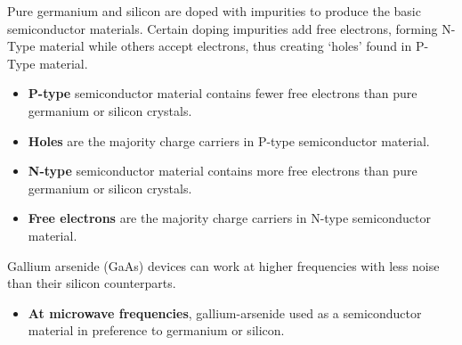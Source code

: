 \documentclass[letterpaper]{article}
\begin{document}
        Pure germanium and silicon are doped with impurities to produce the basic semiconductor materials.
        Certain doping impurities add free electrons, forming N-Type material while others accept electrons, thus creating `holes' found in P-Type material.
        \begin{itemize}
            \item \textbf{P-type} semiconductor material contains fewer free electrons than pure germanium or silicon crystals.
            \item \textbf{Holes} are the majority charge carriers in P-type semiconductor material.
            \item \textbf{N-type} semiconductor material contains more free electrons than pure germanium or silicon crystals.
            \item \textbf{Free electrons} are the majority charge carriers in N-type semiconductor material.
        \end{itemize}

        Gallium arsenide (GaAs) devices can work at higher frequencies with less noise than their silicon counterparts.
        \begin{itemize}
            \item \textbf{At microwave frequencies}, gallium-arsenide used as a semiconductor material in preference to germanium or silicon.
        \end{itemize}
\end{document}

